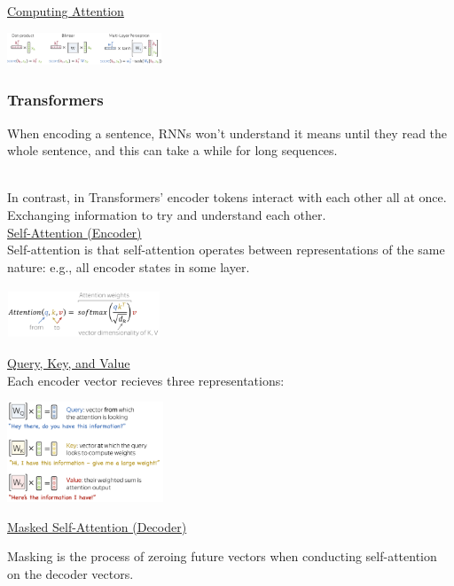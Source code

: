\documentclass[8pt]{extarticle} %
\begin{document}
\begin{multicols*}{3}
\underline{Computing Attention}
\begin{center}
    \includegraphics[width=0.35\textwidth]{media/comp-attention.png}
\end{center}

\subsubsection*{Transformers}
When encoding a sentence, RNNs won't understand it means until they read the whole sentence, and this can take a while for long sequences. \\\

In contrast, in Transformers' encoder tokens interact with each other all at once. Exchanging information to try and understand each other. \\

\underline{Self-Attention (Encoder)}\\

Self-attention is that self-attention operates between representations of the same nature: e.g., all encoder states in some layer.
\begin{center}
    \includegraphics[width=0.35\textwidth]{media/attention-eq.png}
\end{center}
\underline{Query, Key, and Value}\\

Each encoder vector recieves three representations:
\begin{center}
    \includegraphics[width=0.35\textwidth]{media/key-query-value.png}
\end{center}

\underline{Masked Self-Attention (Decoder)}

Masking is the process of zeroing future vectors when conducting self-attention on the decoder vectors.\\


\end{multicols*}
\end{document}

